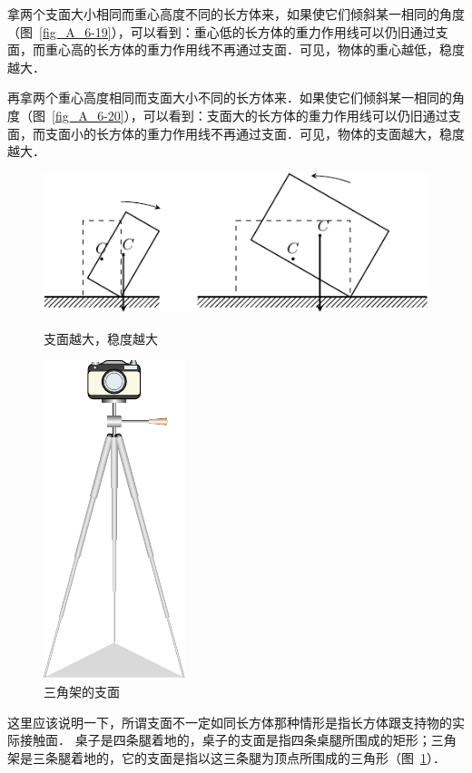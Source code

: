 拿两个支面大小相同而重心高度不同的长方体来，如果使它们倾斜某一相同的角度（图~\ref{fig_A_6-19}），可以看到：重心低的长方体的重力作用线可以仍旧通过支面，而重心高的长方体的重力作用线不再通过支面．可见，物体的重心越低，稳度越大．


再拿两个重心高度相同而支面大小不同的长方体来．如果使它们倾斜某一相同的角度（图~\ref{fig_A_6-20}），可以看到：支面大的长方体的重力作用线可以仍旧通过支面，而支面小的长方体的重力作用线不再通过支面．可见，物体的支面越大，稳度越大．
\begin{figure}[htbp]
    \centering
    \begin{minipage}[t]{0.4\linewidth}
    	\centering
    	\includegraphics{fig/A/6-20.pdf}
    	\caption{支面越大，稳度越大}\label{fig_A_6-20}
    \end{minipage}
    \hfil
    \begin{minipage}[t]{0.4\linewidth}
    	\centering
    	\includegraphics{fig/A/6-21.pdf}
    	\caption{三角架的支面}\label{fig_A_6-21}
    \end{minipage}
\end{figure}

这里应该说明一下，所谓支面不一定如同长方体那种情形是指长方体跟支持物的实际接触面．
桌子是四条腿着地的，桌子的支面是指四条桌腿所围成的矩形；三角架是三条腿着地的，它的支面是指以这三条腿为顶点所围成的三角形（图~\ref{fig_A_6-21}）．


